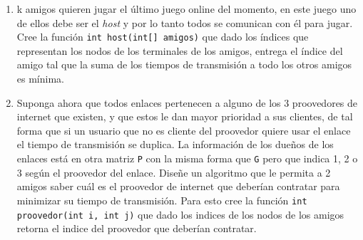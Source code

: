 \documentclass[dcc,uchile]{fcfmcourse}
\begin{document}
\begin{problems}
\begin{enumerate}
    \item k amigos quieren jugar el último juego online del momento, en este juego uno de ellos debe ser el \textit{host} y por lo tanto todos se comunican con él para jugar. Cree la función \texttt{int host(int[] amigos)} que dado los índices que representan los nodos de los terminales de los amigos, entrega el índice del amigo tal que la suma de los tiempos de transmisión a todo los otros amigos es mínima. 
    \item Suponga ahora que todos enlaces pertenecen a alguno de los 3 proovedores de internet que existen, y que estos le dan mayor prioridad a sus clientes, de tal forma que si un usuario que no es cliente del proovedor quiere usar el enlace el tiempo de transmisión se duplica. La información de los dueños de los enlaces está en otra matriz \texttt{P} con la misma forma que \texttt{G} pero que indica 1, 2 o 3 según el proovedor del enlace. Diseñe un algoritmo que le permita a 2 amigos saber cuál es el proovedor de internet que deberían contratar para minimizar su tiempo de transmisión. Para esto cree la función \texttt{int proovedor(int i, int j)} que dado los indices de los nodos de los amigos retorna el indice del proovedor que deberían contratar.
\end{enumerate}

\end{problems}
\end{document}
